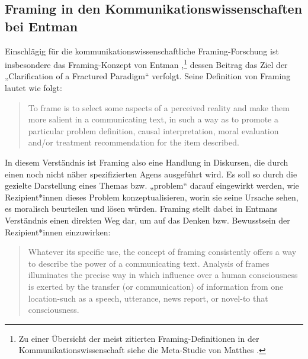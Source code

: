 \subsection{Framing in den Kommunikationswissenschaften bei Entman}\label{framing-in-den-kommunikationswissenschaften-bei-entman}

Einschlägig für die kommunikationswissenschaftliche Framing-Forschung ist insbesondere das Framing-Konzept von Entman \autocite*{entmanFramingClarificationFractured1993},\footnote{Zu einer Übersicht der meist zitierten Framing-Definitionen in der Kommunikationswissenschaft siehe die Meta-Studie von Matthes \autocite*[355]{matthesWhatsFrameContent2009}.} dessen Beitrag das Ziel der „Clarification of a Fractured Paradigm`` verfolgt. Seine Definition von Framing lautet wie folgt:

\begin{quote}
To frame is to select some aspects of a perceived reality and make them more salient in a communicating text, in such a way as to promote a particular problem definition, causal interpretation, moral evaluation and/or treatment recommendation for the item described. \autocite[52]{entmanFramingClarificationFractured1993}
\end{quote}

In diesem Verständnis ist Framing also eine Handlung in Diskursen, die durch einen noch nicht näher spezifizierten Agens ausgeführt wird. Es soll so durch die gezielte Darstellung eines Themas bzw. „problem`` darauf eingewirkt werden, wie Rezipient*innen dieses Problem konzeptualisieren, worin sie seine Ursache sehen, es moralisch beurteilen und lösen würden. Framing stellt dabei in Entmans Verständnis einen direkten Weg dar, um auf das Denken bzw. Bewusstsein der Rezipient*innen einzuwirken:

\begin{quote}
Whatever its specific use, the concept of framing consistently offers a way to describe the power of a communicating text. Analysis of frames illuminates the precise way in which influence over a human consciousness is exerted by the transfer (or communication) of information from one location-such as a speech, utterance, news report, or novel-to that consciousness. \autocite[51-52]{entmanFramingClarificationFractured1993}
\end{quote}


